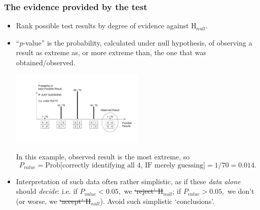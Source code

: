\documentclass[10pt]{beamer}\usepackage[]{graphicx}\usepackage[]{color}
\begin{document}
\begin{frame}
	\frametitle{The evidence provided by the test}
	
	\begin{footnotesize}
		\begin{itemize}
			\item
			Rank possible test
			results by  degree of evidence against H$_{null}$. 
			\item ``$p$-value'' is the probability, calculated under null hypothesis, of
			observing a result as  extreme as, or more extreme than, the one that was obtained/observed.
			\begin{center}
				\includegraphics[width=2.5in]{ProbResults.pdf}
			\end{center}
			\pause
			In this example, observed result is the most extreme, so
			$$P_{value}=\textrm{Prob[correctly identifying all 4, IF merely guessing]} = 1/70 = 0.014.$$ \pause
			\item
			Interpretation of such data  often  rather simplistic, as if these \textit{data alone} should \textit{decide}:  i.e. if $P_{value} < 0.05,$ we \sout{`reject' H}$_{null}$; if $P_{value} > 0.05,$ we don't (or worse, we \sout{`accept' H}$_{null}$). Avoid such simplistic `conclusions'.
			
		\end{itemize}
	\end{footnotesize}
\end{frame}
\end{document}
